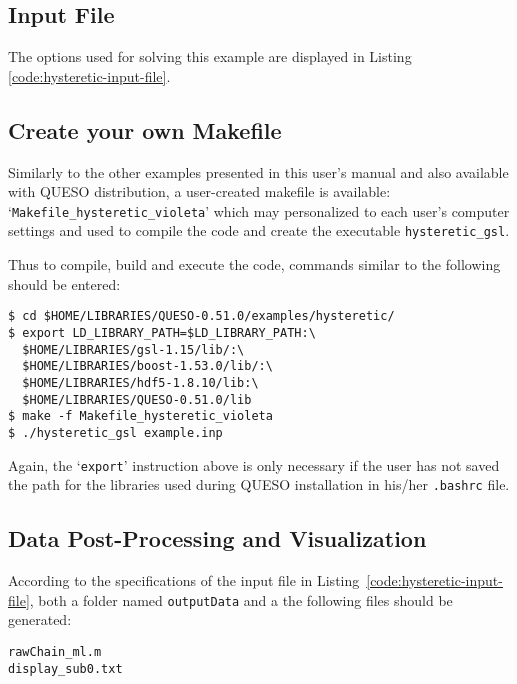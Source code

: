 \subsection{Input File}\label{sec:hysteretic-input-file}


The options used for solving this example are displayed in Listing \ref{code:hysteretic-input-file}. 



\subsection{Create your own Makefile}\label{sec:hysteretic-makefile}

Similarly to the other examples presented in this user's manual and also available with QUESO distribution, a user-created makefile is available: `\texttt{Makefile\_hysteretic\_violeta}' which may personalized to each user's computer settings and used to compile the code and create the executable \verb+hysteretic_gsl+. 

Thus to compile, build and execute the code,  commands similar to the following should be entered:
\begin{lstlisting}
$ cd $HOME/LIBRARIES/QUESO-0.51.0/examples/hysteretic/
$ export LD_LIBRARY_PATH=$LD_LIBRARY_PATH:\
  $HOME/LIBRARIES/gsl-1.15/lib/:\
  $HOME/LIBRARIES/boost-1.53.0/lib/:\
  $HOME/LIBRARIES/hdf5-1.8.10/lib:\
  $HOME/LIBRARIES/QUESO-0.51.0/lib 
$ make -f Makefile_hysteretic_violeta 
$ ./hysteretic_gsl example.inp
\end{lstlisting}

Again, the `\verb+export+' instruction above is only necessary if the user has not saved the path for the libraries used during QUESO installation in his/her \verb+.bashrc+ file. 



\subsection{Data Post-Processing and Visualization}\label{sec:hysteretic-results}



According to the specifications of the input file in Listing~\ref{code:hysteretic-input-file}, both a folder named \verb+outputData+ and a the following files should be generated:
\begin{verbatim}
rawChain_ml.m 
display_sub0.txt    
\end{verbatim}

